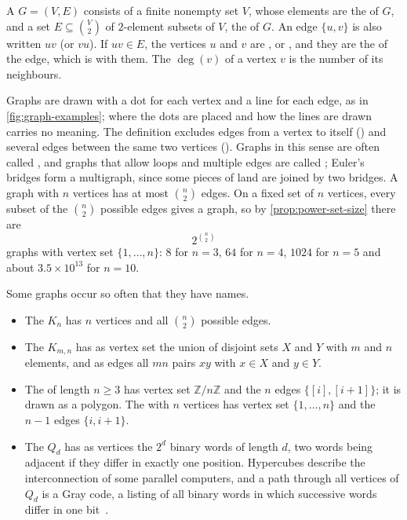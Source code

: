 \begin{definition}[Graph]
\label{def:graph}
A  $G=(V,E)$ consists of a finite nonempty set $V$, whose elements are the  of $G$, and a set $E\subseteq\binom V2$ of $2$-element subsets of $V$, the  of $G$. An edge $\{u,v\}$ is also written $uv$ (or $vu$). If $uv\in E$, the vertices $u$ and $v$ are , or , and they are the  of the edge, which is  with them. The  $\deg(v)$ of a vertex $v$ is the number of its neighbours.
\end{definition}

Graphs are drawn with a dot for each vertex and a line for each edge, as in \cref{fig:graph-examples}; where the dots are placed and how the lines are drawn carries no meaning. The definition excludes edges from a vertex to itself () and several edges between the same two vertices (). Graphs in this sense are often called , and graphs that allow loops and multiple edges are called ; Euler's bridges form a multigraph, since some pieces of land are joined by two bridges. A graph with $n$ vertices has at most $\binom n2$ edges. On a fixed set of $n$ vertices, every subset of the $\binom n2$ possible edges gives a graph, so by \cref{prop:power-set-size} there are
\[
2^{\binom n2}
\]
graphs with vertex set $\{1,\ldots,n\}$: $8$ for $n=3$, $64$ for $n=4$, $1024$ for $n=5$ and about $3.5\times10^{13}$ for $n=10$.

Some graphs occur so often that they have names.
\begin{itemize}
\item The  $K_n$ has $n$ vertices and all $\binom n2$ possible edges.
\item The  $K_{m,n}$ has as vertex set the union of disjoint sets $X$ and $Y$ with $m$ and $n$ elements, and as edges all $mn$ pairs $xy$ with $x\in X$ and $y\in Y$.
\item The  of length $n\ge3$ has vertex set $\mathbb Z/n\mathbb Z$ and the $n$ edges $\{[i],[i+1]\}$; it is drawn as a polygon. The  with $n$ vertices has vertex set $\{1,\ldots,n\}$ and the $n-1$ edges $\{i,i+1\}$.
\item The  $Q_d$ has as vertices the $2^d$ binary words of length $d$, two words being adjacent if they differ in exactly one position. Hypercubes describe the interconnection of some parallel computers, and a path through all vertices of $Q_d$ is a Gray code, a listing of all binary words in which successive words differ in one bit~\cite[Sect.~7.2.1.1]{knuth2011taocp4a}.
\end{itemize}

